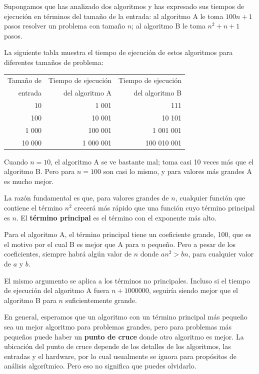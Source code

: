 \documentclass[10pt]{book}
\begin{document}
Supongamos que has analizado dos algoritmos y has expresado
sus tiempos de ejecución en términos del tamaño de la entrada:
al algoritmo A le toma $100n+1$ pasos resolver un problema con
tamaño $n$; al algoritmo B le toma $n^2 + n + 1$ pasos.

La siguiente tabla muestra el tiempo de ejecución de estos algoritmos
para diferentes tamaños de problema:

\begin{tabular}{|r|r|r|}
\hline
Tamaño de & Tiempo de ejecución & Tiempo de ejecución \\
entrada   & del algoritmo A     & del algoritmo B \\
\hline
10        &   1 001             & 111         \\
100       &   10 001            & 10 101         \\
1 000     &   100 001           & 1 001 001         \\
10 000    &   1 000 001         & 100 010 001         \\
\hline
\end{tabular}

Cuando $n=10$, el algoritmo A se ve bastante mal; toma casi 10 veces
más que el algoritmo B.  Pero para $n=100$ son casi lo mismo, y
para valores más grandes A es mucho mejor.

La razón fundamental es que, para valores grandes de $n$, cualquier función
que contiene el término $n^2$ crecerá más rápido que una función cuyo
término principal es $n$.  El {\bf término principal} es el término con el
exponente más alto.

Para el algoritmo A, el término principal tiene un coeficiente grande, 100, que
es el motivo por el cual B es mejor que A para $n$ pequeño.  Pero a pesar de los
coeficientes, siempre habrá algún valor de $n$ donde
$a n^2 > b n$, para cualquier valor de $a$ y $b$.

El mismo argumento se aplica a los términos no principales.  Incluso si el tiempo
de ejecución del algoritmo A fuera $n+1000000$, seguiría siendo mejor que el
algoritmo B para $n$ suficientemente grande.

En general, esperamos que un algoritmo con un término principal más pequeño sea un
mejor algoritmo para problemas grandes, pero para problemas más pequeños puede
haber un {\bf punto de cruce} donde otro algoritmo es mejor.  La
ubicación del punto de cruce depende de los detalles de los
algoritmos, las entradas y el hardware, por lo cual usualmente se ignora para
propósitos de análisis algorítmico.  Pero eso no significa que puedes
olvidarlo.
\end{document}
